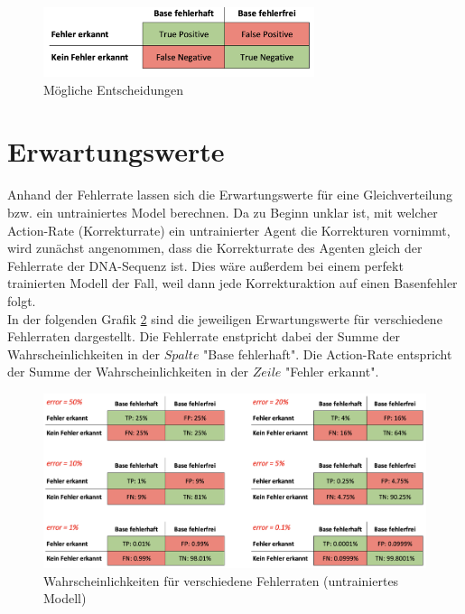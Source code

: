\documentclass[oneside,bibliography=totocnumbered,BCOR=5mm]{scrbook}%
\theoremstyle{definition}
\theoremstyle{definition}
\theoremstyle{definition}
\theoremstyle{definition}
\theoremstyle{definition}
\theoremstyle{definition}
\begin{document}
\begin{figure}[h]
  \centering
  \includegraphics[width=300px,keepaspectratio]{images/TP_FN.png}
  \caption{Mögliche Entscheidungen}
  \label{TPFN}
  \end{figure}
%

\newpage

\section{Erwartungswerte}

Anhand der Fehlerrate lassen sich die Erwartungswerte für eine Gleichverteilung
bzw. ein untrainiertes Model berechnen. Da zu Beginn unklar ist, 
mit welcher Action-Rate (Korrekturrate) ein untrainierter Agent die Korrekturen vornimmt,
wird zunächst angenommen, dass die Korrekturrate des Agenten gleich der Fehlerrate der DNA-Sequenz ist. 
Dies wäre außerdem bei einem perfekt trainierten Modell der Fall, weil 
dann jede Korrekturaktion auf einen Basenfehler folgt.\\

In der folgenden Grafik \ref{probabliltiesForErrorRates} sind die jeweiligen Erwartungswerte für verschiedene Fehlerraten
dargestellt. Die Fehlerrate enstpricht dabei der Summe der Wahrscheinlichkeiten in der
\(Spalte\) "Base fehlerhaft". Die Action-Rate entspricht der Summe der Wahrscheinlichkeiten
in der \(Zeile\) "Fehler erkannt".\\

\begin{figure}[h]
  \centering
  \includegraphics[width=\textwidth,keepaspectratio]{images/error_rate.png}
  \caption{Wahrscheinlichkeiten für verschiedene Fehlerraten (untrainiertes Modell)}
  \label{probabliltiesForErrorRates}
\end{figure}
\end{document}

